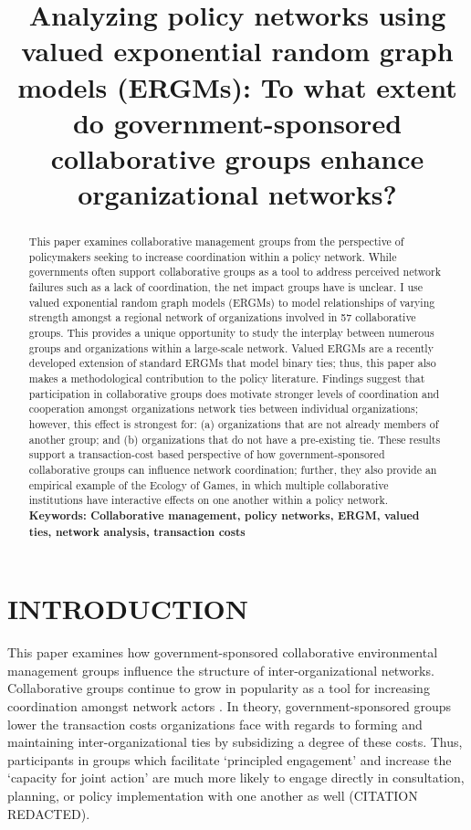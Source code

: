 \documentclass[12pt,a4paper,titlepage]{article}
\title{Analyzing policy networks using valued exponential random graph models (ERGMs): To what extent do government-sponsored collaborative groups enhance organizational networks?}
\begin{document}
\singlespacing
\maketitle

\begin{abstract}
\singlespacing

This paper examines collaborative management groups from the perspective of policymakers seeking to increase coordination within a policy network. While governments often support collaborative groups as a tool to address perceived network failures such as a lack of coordination, the net impact groups have is unclear. I use valued exponential random graph models (ERGMs) to model relationships of varying strength amongst a regional network of organizations involved in 57 collaborative groups. This provides a unique opportunity to study the interplay between numerous groups and organizations within a large-scale network. Valued ERGMs are a recently developed extension of standard ERGMs that model binary ties; thus, this paper also makes a methodological contribution to the policy literature. Findings suggest that participation in collaborative groups does motivate stronger levels of coordination and cooperation amongst organizations network ties between individual organizations; however, this effect is strongest for: (a) organizations that are not already members of another group; and (b) organizations that do not have a pre-existing tie. These results support a transaction-cost based perspective of how government-sponsored collaborative groups can influence network coordination; further, they also provide an empirical example of the Ecology of Games, in which multiple collaborative institutions have interactive effects on one another within a policy network.\\



\noindent
\bf{Keywords}: Collaborative management, policy networks, ERGM, valued ties, network analysis, transaction costs
\end{abstract}

\doublespacing
\section{\bf\MakeUppercase{Introduction}}

This paper examines how government-sponsored collaborative environmental management groups influence the structure of inter-organizational networks. Collaborative groups continue to grow in popularity as a tool for increasing coordination amongst network actors \parencite{margerum2011}. In theory, government-sponsored groups lower the transaction costs organizations face with regards to forming and maintaining inter-organizational ties by subsidizing a degree of these costs. Thus, participants in groups which facilitate `principled engagement' and increase the `capacity for joint action' \parencite{emerson2012} are much more likely to engage directly in consultation, planning, or policy implementation with one another as well (CITATION REDACTED).
\end{document}
